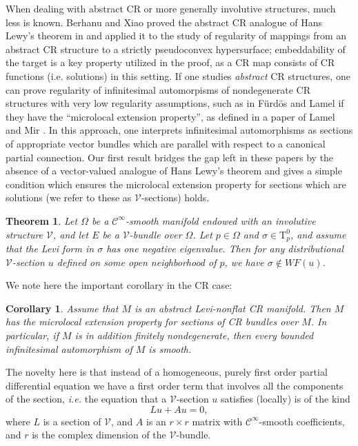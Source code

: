 \documentclass[11pt]{amsart}
\newcommand{\crb}{\mathcal{V}}
\theoremstyle{definition}
\theoremstyle{remark}
\theoremstyle{plain}
\newtheorem{cor}[defn]{Corollary}
\newtheorem{thm}[defn]{Theorem}
\begin{document}
When dealing with abstract CR or more generally involutive structures, much less is known.
Berhanu and Xiao proved the abstract CR analogue of Hans Lewy's theorem in \cite[Theorem 2.9]{berhanu2015}
and applied it to the study of regularity of mappings from an abstract CR structure to a strictly
pseudoconvex hypersurface; embeddability of the target is a key property utilized in the proof,
as a CR map consists of CR functions (i.e. solutions) in this setting. If one studies
{\em abstract} CR structures, one can prove regularity of infinitesimal automorpisms
of nondegenerate CR structures with very low regularity
assumptions, such as in F\"urd\"os and Lamel \cite{Furdos:2016vu} if they
have the ``microlocal extension property'', as defined in a paper of Lamel and Mir \cite{MR4713116}.
In this approach, one interprets infinitesimal automorphisms as sections of appropriate
vector bundles which are parallel with respect to a canonical partial connection. Our first
result bridges the gap left in these papers by the absence of a vector-valued
analogue of Hans Lewy's theorem and gives a simple condition which ensures the microlocal
extension property for sections which are solutions (we refer to these as $\crb$-sections) holds. 
 
%
\begin{thm}\label{thm:levi_microlocal_regularity}
  Let $\Omega$ be a $\mathcal{C}^\infty$-smooth manifold endowed with
  an involutive structure $\mathcal{V}$, and let $E$ be a
  $\mathcal{V}$-bundle over $\Omega$. Let $p \in \Omega$ and
  $\sigma \in \mathrm{T}^0_p$, and assume that the Levi form in
  $\sigma$ has one negative eigenvalue. Then for any 
  distributional $\crb$-section  $u$ defined on some open neighborhood of $p$,
  we have $\sigma \notin WF(u)$.
\end{thm}


We note here the important corollary in the CR case:

\begin{cor} Assume that $M$ is an abstract Levi-nonflat CR manifold. Then $M$ has
  the microlocal extension property for sections of CR bundles over $M$. In particular,
  if $M$ is in addition finitely nondegenerate, then every
  bounded infinitesimal automorphism of $M$ is smooth. 
\end{cor}


 The novelty here is that instead of a homogeneous, purely
first order partial differential equation we have a first order term
that involves all the components of the section, \textit{i.e.} the
equation that a $\crb$-section $u$ satisfies (locally) is of the kind
%
\[
  L u + A u = 0,
\]
%
where $L$ is a section of $\crb$, and $A$ is an $r\times r$ matrix with
$\mathcal{C}^\infty$-smooth coefficients, and $r$ is the complex
dimension of the $\crb$-bundle.
\end{document}
